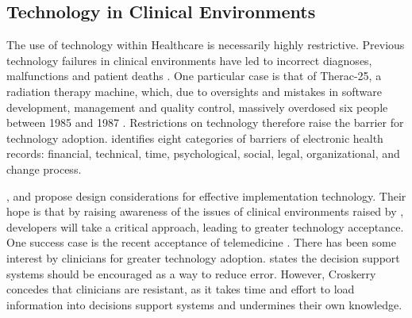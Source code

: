 \documentclass[a4paper]{scrartcl}     %
\begin{document}
  \subsection{Technology in Clinical Environments}



    The use of technology within Healthcare is necessarily highly restrictive. Previous technology failures in clinical environments have led to incorrect diagnoses, malfunctions and patient deaths \citep{Leveson1993}. One particular case is that of Therac-25, a radiation therapy machine, which, due to oversights and mistakes in software development, management and quality control, massively overdosed six people between 1985 and 1987 \citep{Leveson1993}. Restrictions on technology therefore raise the barrier for technology adoption. \citet{Boonstra2010} identifies eight categories of barriers of electronic health records: financial, technical, time, psychological, social, legal, organizational, and change process.

    \citet{Beuscart-Zephir1997}, \citet{Ovretveit2007} and \citet{Taneva2014} propose design considerations for effective implementation technology. Their hope is that by raising awareness of the issues of clinical environments raised by \citet{Boonstra2010}, developers will take a critical approach, leading to greater technology acceptance. One success case is the recent acceptance of telemedicine \citep{Chau2002}. There has been some interest by clinicians for greater technology adoption. \citet{Croskerry2013a} states the decision support systems should be encouraged as a way to reduce error. However, Croskerry concedes that clinicians are resistant, as it takes time and effort to load information into decisions support systems and undermines their own knowledge.






\end{document}
